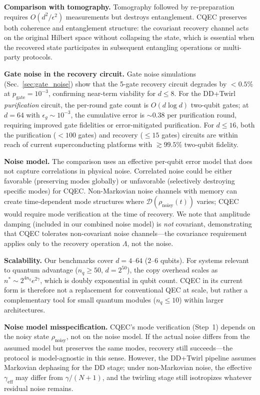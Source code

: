 \documentclass[prx,twocolumn,superscriptaddress,longbibliography,floatfix]{revtex4-2}
\begin{document}
\textbf{Comparison with tomography.}
Tomography followed by re-preparation requires $O(d^2/\epsilon^2)$ measurements but destroys entanglement.
CQEC preserves both coherence and entanglement structure: the covariant recovery channel acts on the original Hilbert space without collapsing the state, which is essential when the recovered state participates in subsequent entangling operations or multi-party protocols.

\textbf{Gate noise in the recovery circuit.}
Gate noise simulations (Sec.~\ref{sec:gate_noise}) show that the 5-gate recovery circuit degrades by $< 0.5\%$ at $p_\mathrm{gate} = 10^{-3}$, confirming near-term viability for $d \leq 8$.
For the DD+Twirl \emph{purification} circuit, the per-round gate count is $O(d \log d)$ two-qubit gates; at $d = 64$ with $\epsilon_g \sim 10^{-3}$, the cumulative error is $\sim\!0.38$ per purification round, requiring improved gate fidelities or error-mitigated purification.
For $d \leq 16$, both the purification ($<\!100$ gates) and recovery ($\leq 15$ gates) circuits are within reach of current superconducting platforms with $\gtrsim\!99.5\%$ two-qubit fidelity.

\textbf{Noise model.}
The comparison uses an effective per-qubit error model that does not capture correlations in physical noise.
Correlated noise could be either favorable (preserving modes globally) or unfavorable (selectively destroying specific modes) for CQEC.
Non-Markovian noise channels with memory can create time-dependent mode structures where $\mathcal{D}(\rho_\mathrm{noisy}(t))$ varies; CQEC would require mode verification at the time of recovery.
We note that amplitude damping (included in our combined noise model) is \emph{not} covariant, demonstrating that CQEC tolerates non-covariant noise channels---the covariance requirement applies only to the recovery operation $\Lambda$, not the noise.

\textbf{Scalability.}
Our benchmarks cover $d = 4$--$64$ ($2$--$6$ qubits).
For systems relevant to quantum advantage ($n_q \geq 50$, $d = 2^{50}$), the copy overhead scales as $n^* \sim 2^{4n_q} e^{2\gamma}$, which is doubly exponential in qubit count.
CQEC in its current form is therefore not a replacement for conventional QEC at scale, but rather a complementary tool for small quantum modules ($n_q \leq 10$) within larger architectures.

\textbf{Noise model misspecification.}
CQEC's mode verification (Step~1) depends on the noisy state $\rho_\mathrm{noisy}$, not on the noise model.
If the actual noise differs from the assumed model but preserves the same modes, recovery still succeeds---the protocol is model-agnostic in this sense.
However, the DD+Twirl pipeline assumes Markovian dephasing for the DD stage; under non-Markovian noise, the effective $\gamma_\mathrm{eff}$ may differ from $\gamma/(N+1)$, and the twirling stage still isotropizes whatever residual noise remains.
\end{document}
